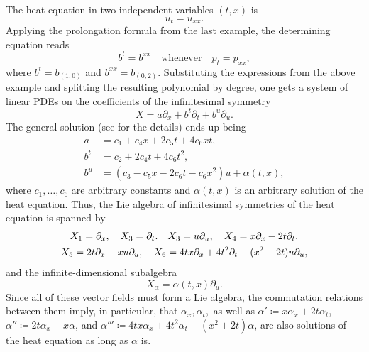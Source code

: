 \begin{example}
    The heat equation in two independent variables $(t,x)$ is 
    \[u_t=u_{xx}.\]
    Applying the prolongation formula from the last example, the determining equation reads 
    \[b^t=b^{xx} \quad \text{whenever}\quad p_t=p_{xx} ,\]
    where $b^t=b_{(1,0)}$ and $b^{xx}=b_{(0,2)}$. Substituting the expressions from the above example and splitting the resulting polynomial by degree, one gets a system of linear PDEs on the coefficients of the infinitesimal symmetry 
    \[X=a\partial_x+b^t\partial_t+b^u\partial_u.\]
    The general solution (see \cite[Example~2.41]{Olver} for the details) ends up being 
    \[
    \begin{split}
        a&=c_1+c_4 x+2c_5 t+4c_6 xt,\\
        b^t &= c_2+2c_4 t+4c_6 t^2,\\
        b^u &= (c_3-c_5 x-2c_6t-c_6x^2)u+\alpha(t,x),
    \end{split}
    \]
    where $c_1,\ldots,c_6$ are arbitrary constants and $\alpha(t,x)$ is an arbitrary solution of the heat equation. Thus, the Lie algebra of infinitesimal symmetries of the heat equation is spanned by 
    \begin{gather}
        X_1=\partial_x,\quad X_3=\partial_t.\quad X_3=u\partial_u,\quad X_4=x\partial_x+2t\partial_t,\notag \\
        X_5=2t\partial_x-xu\partial_u,\quad X_6=4tx\partial_x+4t^2\partial_t-(x^2+2t)u\partial_u,
    \end{gather}
    and the infinite-dimensional subalgebra 
    \[X_\alpha=\alpha(t,x)\partial_u.\]
    Since all of these vector fields must form a Lie algebra, the commutation relations between them imply, in particular, that $\alpha_x,\alpha_t,$ as well as $\alpha'\coloneqq x\alpha_x+2t\alpha_t$, $\alpha''\coloneqq 2t\alpha_x+x\alpha$, and $\alpha'''\coloneqq 4tx\alpha_x+4t^2\alpha_t+(x^2+2t)\alpha$, are also solutions of the heat equation as long as $\alpha$ is.
    

\end{example}
